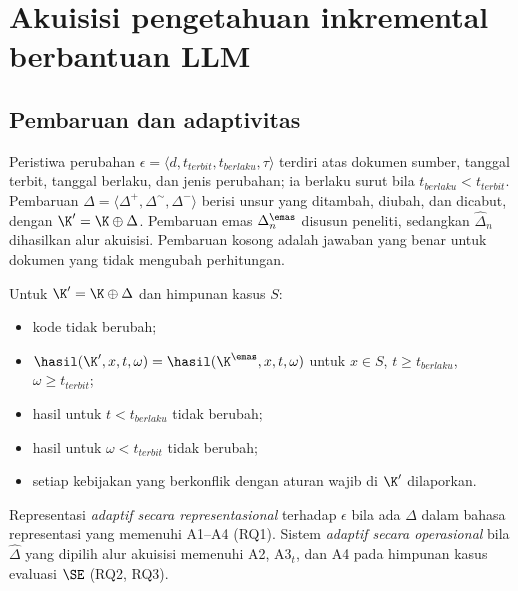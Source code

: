 \section{Akuisisi pengetahuan inkremental berbantuan LLM}
\label{sec:akuisisi}

\subsection{Pembaruan dan adaptivitas}
\label{subsec:adaptif}

\begin{definisi}
\label{def:pembaruan}
Peristiwa perubahan $\epsilon = \langle d, t_{\mathit{terbit}}, t_{\mathit{berlaku}}, \tau \rangle$ terdiri atas dokumen sumber, tanggal terbit, tanggal berlaku, dan jenis perubahan; ia berlaku surut bila $t_{\mathit{berlaku}} < t_{\mathit{terbit}}$. Pembaruan $\Delta = \langle \Delta^{+}, \Delta^{\sim}, \Delta^{-} \rangle$ berisi unsur yang ditambah, diubah, dan dicabut, dengan $\K' = \K \oplus \Delta$. Pembaruan emas $\Delta^{\emas}_n$ disusun peneliti, sedangkan $\hat{\Delta}_n$ dihasilkan alur akuisisi. Pembaruan kosong adalah jawaban yang benar untuk dokumen yang tidak mengubah perhitungan.
\end{definisi}

\begin{definisi}
\label{def:syarat}
Untuk $\K' = \K \oplus \Delta$ dan himpunan kasus $S$:
\begin{itemize}[leftmargin=3.4em,labelsep=0.4em,nosep]
  \item[(A1)] kode  tidak berubah;
  \item[(A2)] $\hasil(\K', x, t, \omega) = \hasil(\K^{\emas}, x, t, \omega)$ untuk $x \in S$, $t \geq t_{\mathit{berlaku}}$, $\omega \geq t_{\mathit{terbit}}$;
  \item[(A3$_t$)] hasil untuk $t < t_{\mathit{berlaku}}$ tidak berubah;
  \item[(A3$_\omega$)] hasil untuk $\omega < t_{\mathit{terbit}}$ tidak berubah;
  \item[(A4)] setiap kebijakan yang berkonflik dengan aturan wajib di $\K'$ dilaporkan.
\end{itemize}
\end{definisi}

\begin{definisi}[Adaptivitas]
\label{def:adapt}
Representasi \emph{adaptif secara representasional} terhadap $\epsilon$ bila ada $\Delta$ dalam bahasa representasi yang memenuhi A1--A4 (RQ1). Sistem \emph{adaptif secara operasional} bila $\hat{\Delta}$ yang dipilih alur akuisisi memenuhi A2, A3$_t$, dan A4 pada himpunan kasus evaluasi $\SE$ (RQ2, RQ3).
\end{definisi}

